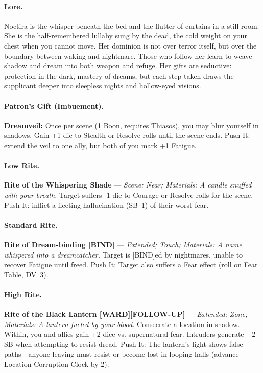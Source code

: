 \documentclass[11pt]{article}
\begin{document}
\paragraph{Lore.}
Noctira is the whisper beneath the bed and the flutter of curtains in a still room. She is the half-remembered lullaby sung by the dead, the cold weight on your chest when you cannot move. Her dominion is not over terror itself, but over the boundary between waking and nightmare. Those who follow her learn to weave shadow and dream into both weapon and refuge. Her gifts are seductive: protection in the dark, mastery of dreams, but each step taken draws the supplicant deeper into sleepless nights and hollow-eyed visions.

\paragraph{Patron’s Gift (Imbuement).}
\textbf{Dreamveil:} Once per scene (1 Boon, requires Thiasos), you may blur yourself in shadows. Gain +1 die to Stealth or Resolve rolls until the scene ends. Push It: extend the veil to one ally, but both of you mark +1 Fatigue.

\paragraph{Low Rite.}
\textbf{Rite of the Whispering Shade} — \emph{Scene; Near; Materials: A candle snuffed with your breath.}  
Target suffers -1 die to Courage or Resolve rolls for the scene. Push It: inflict a fleeting hallucination (SB~1) of their worst fear.

\paragraph{Standard Rite.}
\textbf{Rite of Dream-binding [BIND]} — \emph{Extended; Touch; Materials: A name whispered into a dreamcatcher.}  
Target is [BIND]ed by nightmares, unable to recover Fatigue until freed. Push It: Target also suffers a Fear effect (roll on Fear Table, DV~3).

\paragraph{High Rite.}
\textbf{Rite of the Black Lantern [WARD][FOLLOW-UP]} — \emph{Extended; Zone; Materials: A lantern fueled by your blood.}  
Consecrate a location in shadow. Within, you and allies gain +2 dice vs. supernatural fear. Intruders generate +2 SB when attempting to resist dread. Push It: The lantern’s light shows false paths—anyone leaving must resist or become lost in looping halls (advance Location Corruption Clock by 2).
\end{document}
